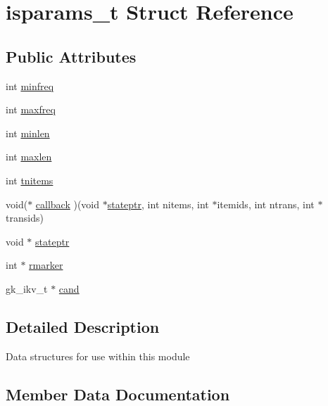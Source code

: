 \hypertarget{structisparams__t}{}\section{isparams\+\_\+t Struct Reference}
\label{structisparams__t}
\subsection*{Public Attributes}
\begin{DoxyCompactItemize}
\item 
int \hyperlink{structisparams__t_a40906758bb0efc7e9c3fdff11d63c412}{minfreq}
\item 
int \hyperlink{structisparams__t_a8ec053e88c745e5ff683e65aa5640205}{maxfreq}
\item 
int \hyperlink{structisparams__t_a544a1225743a310e8dc7f75a9338cae8}{minlen}
\item 
int \hyperlink{structisparams__t_afb1c5ef0ff2184fbd0c739e6ae401e1c}{maxlen}
\item 
int \hyperlink{structisparams__t_aa8d4c3fc130ae48f825e6787f91817df}{tnitems}
\item 
void($\ast$ \hyperlink{structisparams__t_a44008350a5cfced783ffcec870f1822d}{callback} )(void $\ast$\hyperlink{structisparams__t_a11588df8c18be6e4a5721d68d917b2a7}{stateptr}, int nitems, int $\ast$itemids, int ntrans, int $\ast$transids)
\item 
void $\ast$ \hyperlink{structisparams__t_a11588df8c18be6e4a5721d68d917b2a7}{stateptr}
\item 
int $\ast$ \hyperlink{structisparams__t_ae83e2391121d3113b67ddd02c868eb6c}{rmarker}
\item 
gk\+\_\+ikv\+\_\+t $\ast$ \hyperlink{structisparams__t_a714e82249e4f4e55b68721537a06e3bb}{cand}
\end{DoxyCompactItemize}


\subsection{Detailed Description}
Data structures for use within this module 

\subsection{Member Data Documentation}
\mbox{\label{structisparams__t_a44008350a5cfced783ffcec870f1822d}} 
